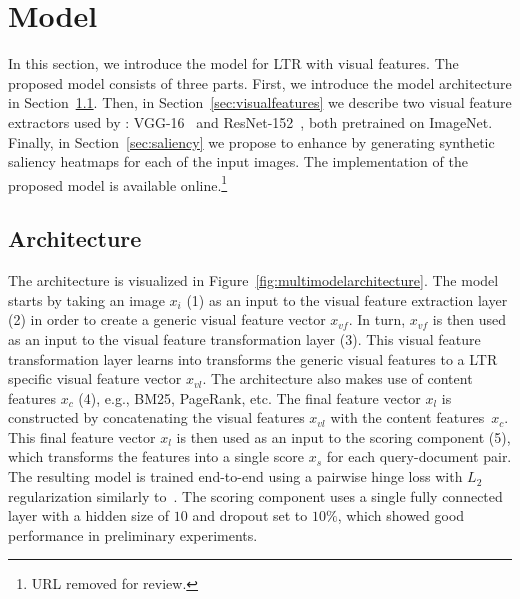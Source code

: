 
\section{\protect\datasetname{} Model}
In this section, we introduce the \datasetname{} model for \ac{LTR} with visual features.
The proposed model consists of three parts.
First, we introduce the model architecture in Section~\ref{sec:multimodal}.
Then, in Section~\ref{sec:visualfeatures} we describe two visual feature extractors used by \datasetname{}:
VGG-16~\cite{simonyan2014very} and ResNet-152~\cite{he2016deep}, both pretrained on ImageNet.
Finally, in Section~\ref{sec:saliency} we propose to enhance \datasetname{} by generating synthetic saliency heatmaps for each of the input images.
The implementation of the proposed \datasetname{} model is available online.\footnote{URL removed for review.}

\subsection{Architecture} \label{sec:multimodal}
The \datasetname{} architecture is visualized in Figure~\ref{fig:multimodelarchitecture}. 
The model starts by taking an image $x_i$ (1) as an input to the visual feature extraction layer (2) in order to create a generic visual feature vector $x_{vf}$. In turn, $x_{vf}$ is then used as an input to the visual feature transformation layer (3).
This visual feature transformation layer learns into transforms the generic visual features to a \ac{LTR} specific visual feature vector $x_{vl}$.
%
The \datasetname{} architecture also makes use of content features $x_{c}$ (4), e.g., BM25, PageRank, etc.
The final feature vector $x_{l}$ is constructed by concatenating the visual features $x_{vl}$ with the content features~$x_{c}$.
%
This final feature vector $x_{l}$ is then used as an input to the scoring component (5),
which transforms the features into a single score $x_s$ for each query-document pair.
The resulting model is trained end-to-end using a pairwise hinge loss with $L_2$ regularization similarly to~\cite{fan2017learning}.
The scoring component uses a single fully connected layer with a hidden size of $10$ and dropout set to $10\%$,
which showed good performance in preliminary experiments.

